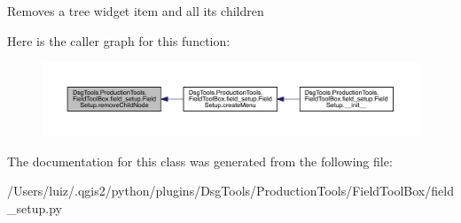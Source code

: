 \begin{DoxyVerb}Removes a tree widget item and all its children
\end{DoxyVerb}
 Here is the caller graph for this function\+:
\nopagebreak
\begin{figure}[H]
\begin{center}
\leavevmode
\includegraphics[width=350pt]{class_dsg_tools_1_1_production_tools_1_1_field_tool_box_1_1field__setup_1_1_field_setup_ab4cb7ebc5baf632cc4c4eb5b4c6e2b54_icgraph}
\end{center}
\end{figure}


The documentation for this class was generated from the following file\+:\begin{DoxyCompactItemize}
\item 
/\+Users/luiz/.\+qgis2/python/plugins/\+Dsg\+Tools/\+Production\+Tools/\+Field\+Tool\+Box/field\+\_\+setup.\+py\end{DoxyCompactItemize}
